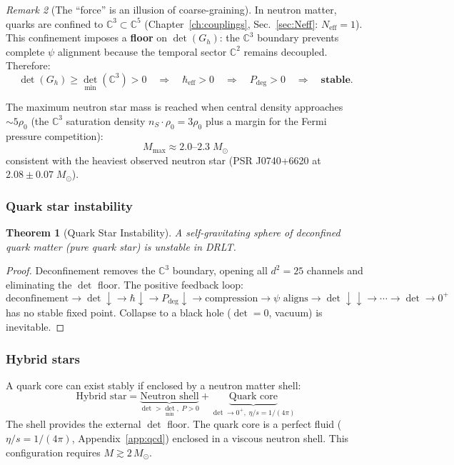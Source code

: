 \documentclass[12pt]{article}
\newtheorem{theorem}{Theorem}[section]
\theoremstyle{remark}
\newtheorem{remark}[theorem]{Remark}
\theoremstyle{definition}
\newcommand{\CC}{\mathbb{C}}
\begin{document}
\begin{remark}[The ``force'' is an illusion of coarse-graining]
In neutron matter, quarks are confined to $\CC^3 \subset \CC^5$ (Chapter~\ref{ch:couplings}, Sec.~\ref{sec:Neff}: $N_\text{eff} = 1$). This confinement imposes a \textbf{floor} on $\det(G_h)$: the $\CC^3$ boundary prevents complete $\psi$ alignment because the temporal sector $\CC^2$ remains decoupled. Therefore:
\begin{equation}
\det(G_h) \geq \det_\text{min}(\CC^3) > 0 \quad\Rightarrow\quad \hbar_\text{eff} > 0 \quad\Rightarrow\quad P_\text{deg} > 0 \quad\Rightarrow\quad \textbf{stable.}
\end{equation}

The maximum neutron star mass is reached when central density approaches $\sim 5\rho_0$ (the $\CC^3$ saturation density $n_S \cdot \rho_0 = 3\rho_0$ plus a margin for the Fermi pressure competition):
\begin{equation}
M_\text{max} \approx 2.0\text{--}2.3\;M_\odot
\end{equation}
consistent with the heaviest observed neutron star (PSR J0740+6620 at $2.08 \pm 0.07\;M_\odot$).

\subsubsection{Quark star instability}

\begin{theorem}[Quark Star Instability]
A self-gravitating sphere of deconfined quark matter (pure quark star) is unstable in DRLT.
\end{theorem}

\begin{proof}
Deconfinement removes the $\CC^3$ boundary, opening all $d^2 = 25$ channels and eliminating the $\det$ floor. The positive feedback loop:
\begin{equation}
\text{deconfinement} \to \det\!\downarrow \to \hbar\!\downarrow \to P_\text{deg}\!\downarrow \to \text{compression} \to \psi\text{ aligns} \to \det\!\downarrow\!\downarrow \to \cdots \to \det \to 0^+
\end{equation}
has no stable fixed point. Collapse to a black hole ($\det = 0$, vacuum) is inevitable.
\end{proof}

\subsubsection{Hybrid stars}

A quark core can exist stably if enclosed by a neutron matter shell:
\begin{equation}
\text{Hybrid star} = \underbrace{\text{Neutron shell}}_{\det > \det_\text{min},\; P > 0} + \underbrace{\text{Quark core}}_{\det \to 0^+,\;\eta/s = 1/(4\pi)}
\end{equation}
The shell provides the external $\det$ floor. The quark core is a perfect fluid ($\eta/s = 1/(4\pi)$, Appendix~\ref{app:qcd}) enclosed in a viscous neutron shell. This configuration requires $M \gtrsim 2\,M_\odot$.


\end{remark}
\end{document}
